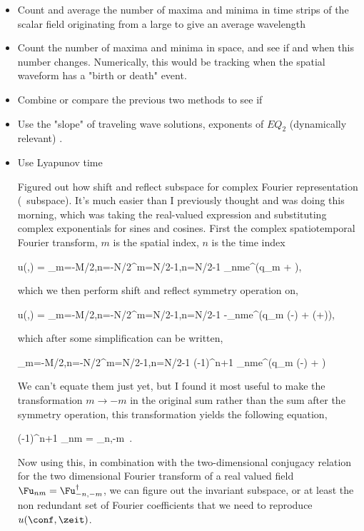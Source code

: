 \begin{itemize}
\item Count and average the number of maxima and minima in time strips of the scalar
    field originating from a large {\twots} to give an average wavelength
\item Count the number of maxima and minima in space, and see if and when this number changes.
    Numerically, this would be tracking when the spatial waveform has a "birth or death" event.
\item Combine or compare the previous two methods to see if 
\item Use the "slope" of traveling wave solutions, exponents of $EQ_2$ (dynamically relevant)
    \eqv.
\item Use Lyapunov time


Figured out how shift and reflect subspace for complex Fourier representation (\ppo\ subspace).
It's much easier than I previously thought and was doing this morning, which was taking the real-valued
expression and substituting complex exponentials for sines and cosines.
First the complex spatiotemporal Fourier transform, $m$ is the spatial index, $n$ is the time index

\beq
u(\conf,\zeit) = \sum_{m=-M/2,n=-N/2}^{m=N/2-1,n=N/2-1} \Fu_{nm}e^{\ii(q_m \conf + \omegaj \zeit)},
\eeq

which we then perform shift and reflect symmetry operation on,

\beq
\tau \Refl u(\conf,\zeit) = \sum_{m=-M/2,n=-N/2}^{m=N/2-1,n=N/2-1} -\Fu_{nm}e^{\ii(q_m (-\conf) + \omegaj (\zeit+))},
\eeq

which after some simplification can be written,

\beq
\sum_{m=-M/2,n=-N/2}^{m=N/2-1,n=N/2-1} (-1)^{n+1} \Fu_{nm}e^{\ii(q_m (-\conf) + \omegaj \zeit)}
\eeq

We can't equate them just yet, but I found it most useful to make the transformation $m\rightarrow -m$ in
the original sum rather than the sum after the symmetry operation, this transformation yields the following
equation,

\beq \label{shiftreflect_ppo_complex}
(-1)^{n+1} \Fu_{nm} = \Fu_{n,-m} \,.
\eeq

Now using this, in combination with the two-dimensional conjugacy relation for the two dimensional
Fourier transform of a real valued field $\Fu_{nm} = \Fu_{-n,-m}^{\dagger}$, we can figure out
the invariant subspace, or at least the non redundant set of Fourier coefficients that we need
to reproduce $u(\conf,\zeit)$.


\end{itemize}
